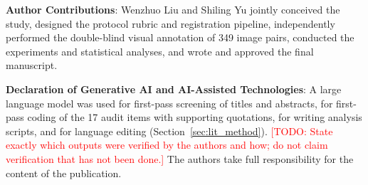 \documentclass[pdflatex,sn-apa]{sn-jnl}
\newcommand{\todo}[1]{\textcolor{red}{[TODO: #1]}}
\begin{document}
\vspace{0.4em}
\noindent\textbf{Author Contributions}: Wenzhuo Liu and Shiling Yu jointly conceived the study, designed the protocol rubric and registration pipeline, independently performed the double-blind visual annotation of 349 image pairs, conducted the experiments and statistical analyses, and wrote and approved the final manuscript.

\vspace{0.4em}
\noindent\textbf{Declaration of Generative AI and AI-Assisted Technologies}: A large language model was used for first-pass screening of titles and abstracts, for first-pass coding of the 17 audit items with supporting quotations, for writing analysis scripts, and for language editing (Section~\ref{sec:lit_method}). \todo{State exactly which outputs were verified by the authors and how; do not claim verification that has not been done.} The authors take full responsibility for the content of the publication.


\end{document}
